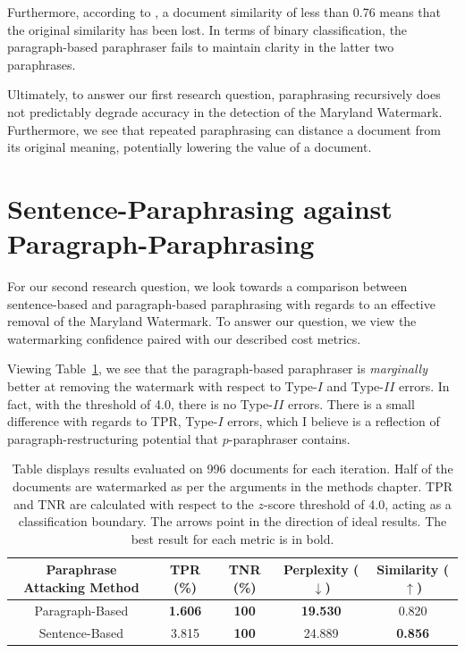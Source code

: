 \documentclass{l4proj}
\theoremstyle{definition}
\begin{document}
    Furthermore, according to \citet{krishna2023paraphrasing}, a document similarity of less than 0.76 means that the original similarity has been lost. In terms of binary classification, the paragraph-based paraphraser fails to maintain clarity in the latter two paraphrases.

    Ultimately, to answer our first research question, paraphrasing recursively does not predictably degrade accuracy in the detection of the Maryland Watermark. Furthermore, we see that repeated paraphrasing can distance a document from its original meaning, potentially lowering the value of a document.
    
\section{Sentence-Paraphrasing against Paragraph-Paraphrasing}
    \label{sec:sentence-against-paragraph}
    For our second research question, we look towards a comparison between sentence-based and paragraph-based paraphrasing with regards to an effective removal of the Maryland Watermark. To answer our question, we view the watermarking confidence paired with our described cost metrics. 

    Viewing Table~\ref{table:sentence-against-paragraph-comparison}, we see that the paragraph-based paraphraser is \emph{marginally} better at removing the watermark with respect to Type-$I$ and Type-$II$ errors. In fact, with the \citet{kirchenbauer2023watermark} threshold of 4.0, there is no Type-$II$ errors. There is a small difference with regards to TPR, Type-$I$ errors, which I believe is a reflection of paragraph-restructuring potential that $p$-paraphraser contains.

    \begin{table}[ht]
        \centering
        \begin{tabular}{c|c|c|c|c}
            Paraphrase Attacking Method & TPR (\%) & TNR (\%) & Perplexity ($\downarrow$) & Similarity ($\uparrow$) \\ \hline
            Paragraph-Based & \textbf{1.606} & \textbf{100} & \textbf{19.530} & 0.820 \\
            Sentence-Based & 3.815 & \textbf{100} & 24.889 & \textbf{0.856}
        \end{tabular}
        \caption{Table displays results evaluated on 996 documents for each iteration. Half of the documents are watermarked as per the arguments in the methods chapter. TPR and TNR are calculated with respect to the $z$-score threshold of 4.0, acting as a classification boundary. The arrows point in the direction of ideal results. The best result for each metric is in bold.}
        \label{table:sentence-against-paragraph-comparison}
    \end{table}
\end{document}
